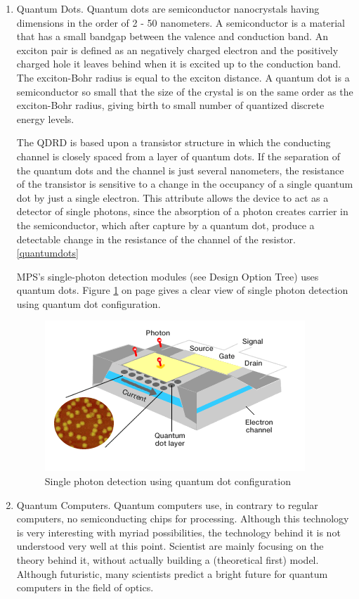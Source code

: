 \begin{enumerate}[i]
\item Quantum Dots. Quantum dots are semiconductor nanocrystals having dimensions in the order of 2 - 50 nanometers. A semiconductor is a material that has a small bandgap between the valence and conduction band. An exciton pair is defined as an negatively charged electron and the positively charged hole it leaves behind when it is excited up to the conduction band. The exciton-Bohr radius is equal to the exciton distance. A quantum dot is a semiconductor so small that the size of the crystal is on the same order as the exciton-Bohr radius, giving birth to small number of quantized discrete energy levels. 

The \acs{QDRD} is based upon a transistor structure in which the conducting channel is closely spaced from a layer of quantum dots. If the separation of the quantum dots and the channel is just several nanometers, the resistance of the transistor is sensitive to a change in the occupancy of a single quantum dot by just a single electron. This attribute allows the device to act as a detector of single photons, since the absorption of a photon creates carrier in the semiconductor, which after capture by a quantum dot, produce a detectable change in the resistance of the channel of the resistor.
\ref{quantumdots}

MPS's single-photon detection modules (see Design Option Tree) uses quantum dots.
Figure \ref{quantumdot} on page \pageref{quantumdot} gives a clear view of single photon detection using quantum dot configuration.
\begin{figure} [h]
	\begin{center}
\includegraphics[scale=1]{chapters/img/blDOreceiverQDRD.png}	
\caption{Single photon detection using quantum dot configuration}
\label{quantumdot}
\end{center}
\end{figure}

\item Quantum Computers. Quantum computers use, in contrary to regular computers, no semiconducting chips for processing. Although this technology is very interesting with myriad possibilities, the technology behind it is not understood very well at this point. Scientist are mainly focusing on the theory behind it, without actually building a (theoretical first) model. Although futuristic, many scientists predict a bright future for quantum computers in the field of optics.


\end{enumerate}
